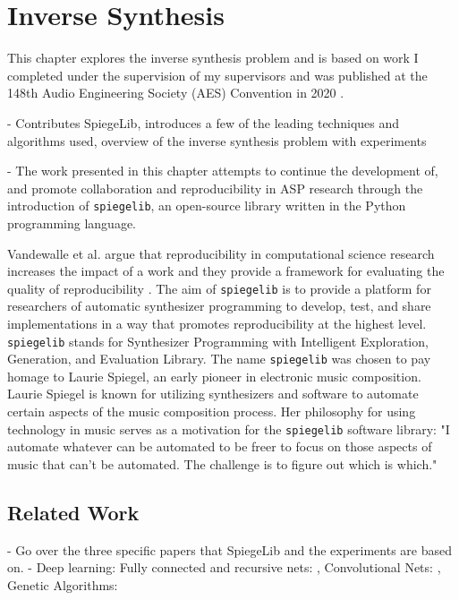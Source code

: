 \chapter{Inverse Synthesis}
\label{chapter:inverse_synth}


This chapter explores the inverse synthesis problem and is based on work I completed under the supervision of my supervisors and was published at the 148th Audio Engineering Society (AES) Convention in 2020 \cite{shier2020spiegelib}.

- Contributes SpiegeLib, introduces a few of the leading techniques and algorithms used, overview of the inverse synthesis problem with experiments

- The work presented in this chapter attempts to continue the development of, and promote collaboration and reproducibility in ASP research through the introduction of \texttt{spiegelib}, an open-source library written in the Python programming language. 

Vandewalle et al. argue that reproducibility in computational science research increases the impact of a work and they provide a framework for evaluating the quality of reproducibility \cite{vandewalle2009reproducible}. The aim of \texttt{spiegelib} is to provide a platform for researchers of automatic synthesizer programming to develop, test, and share implementations in a way that promotes reproducibility at the highest level. \texttt{spiegelib} stands for Synthesizer Programming with Intelligent Exploration, Generation, and Evaluation Library. The name \texttt{spiegelib} was chosen to pay homage to Laurie Spiegel, an early pioneer in electronic music composition. Laurie Spiegel is known for utilizing synthesizers and software to automate certain aspects of the music composition process. Her philosophy for using technology in music serves as a motivation for the \texttt{spiegelib} software library: "I automate whatever can be automated to be freer to focus on those aspects of music that can't be automated. The challenge is to figure out which is which." \cite{hinkle2006women}

\section{Related Work}
- Go over the three specific papers that SpiegeLib and the experiments are based on.
- Deep learning: Fully connected and recursive nets: \cite{yee2018automatic}, Convolutional Nets: \cite{barkan2019inversynth}, Genetic Algorithms: \cite{tatar2016automatic}

